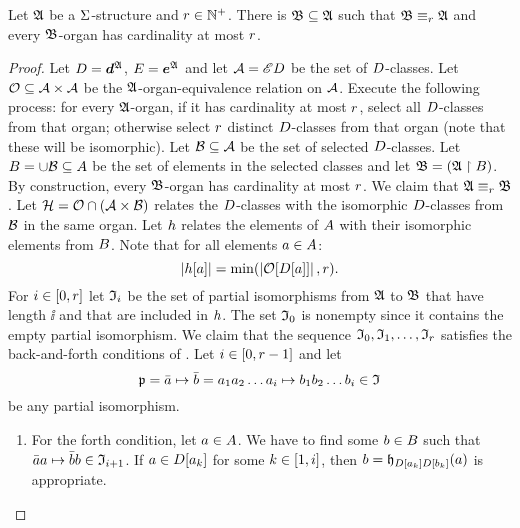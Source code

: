 \begin{lemma}\label{lem:monadic-organ}
Let $\mathfrak{A}$ be a $\mathrm{\Sigma}$-structure and $r \in \mathbb{N}^{+}$.
There is $\mathfrak{B} \subseteq \mathfrak{A}$ such that $\mathfrak{B} \equiv_{r} \mathfrak{A}$ and every
$\mathfrak{B}$-organ has cardinality at most $r$.
\end{lemma}
\begin{proof}
Let $D = \bm{d}^{\mathfrak{A}}$, $E = \bm{e}^{\mathfrak{A}}$ and
let $\mathcal{A} = {\mathscr{E}D}$ be the set of $D$-classes.
Let $\mathcal{O} \subseteq {\mathcal{A}\times\mathcal{A}}$ be the $\mathfrak{A}$-organ-equivalence relation
on $\mathcal{A}$.
Execute the following process: for every $\mathfrak{A}$-organ, if it has cardinality at
most $r$, select all $D$-classes from that organ; otherwise select $r$
distinct $D$-classes from that organ (note that these will be isomorphic).
Let $\mathcal{B} \subseteq \mathcal{A}$ be the set of selected $D$-classes.
Let $B = \cup \mathcal{B} \subseteq A$ be the set of elements in the selected
classes and let $\mathfrak{B} = (\mathfrak{A} \restriction B)$.
By construction, every $\mathfrak{B}$-organ has cardinality at most $r$.
We claim that $\mathfrak{A} \equiv_{r} \mathfrak{B}$.
Let $\mathcal{H} = \mathcal{O} \cap (\mathcal{A}\times\mathcal{B})$ relates the $D$-classes with the
isomorphic $D$-classes from $\mathcal{B}$ in the same organ.
Let $h$ relates the elements of $A$ with their isomorphic elements from
$B$.
Note that for all elements $a \in A$:
\begin{equation}\label{eq:monadic-organ}
  \card{\selh[\ea]} = \min(\card{\Org[\relD[\ea]]}, \nr).
\end{equation}
For $i\in[0,r]$ let $\mathfrak{I}_{i}$ be the set of partial isomorphisms from
$\mathfrak{A}$ to $\mathfrak{B}$ that have length $\ii$ and that are included in $h$.
The set $\mathfrak{I}_{0}$ is nonempty since it contains the empty partial isomorphism.
We claim that the sequence $\mathfrak{I}_{0},\mathfrak{I}_{1},\dots,\mathfrak{I}_{r}$ satisfies the
back-and-forth conditions of .
Let $i \in [0,r-1]$ and let 
\[
  \mathfrak{p} = \bar{a} \mapsto \bar{b} =
  a_{1}a_{2}\dots a_{i} \mapsto b_{1}b_{2}\dots b_{i} \in \mathfrak{I}
\]
be any partial isomorphism.
\begin{enumerate}
  \item For the forth condition, let $a \in A$.
  We have to find some $b \in B$ such that
  $\bar{a}a \mapsto \bar{b}b \in \mathfrak{I}_{i+1}$.
  If $a \in D[a_{k}]$ for some $k \in [1,i]$,
  then $b = \mathfrak{h}_{D[a_{k}]D[b_{k}]}(a)$ is appropriate.
  

\end{enumerate}
\end{proof}
